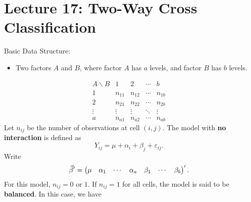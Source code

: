 \section{Lecture 17: Two-Way Cross Classification}
Basic Data Structure:
\begin{itemize}
    \item Two factors $ A $ and $ B $, where
          factor $ A $ has $ a $ levels, and factor $ B $
          has $ b $ levels.
\end{itemize}
\[ \begin{array}{ccccc}
        A\backslash B & 1      & 2      & \cdots & b      \\
        1             & n_{11} & n_{12} & \cdots & n_{1b} \\
        2             & n_{21} & n_{22} & \cdots & n_{2b} \\
        \vdots        & \vdots & \vdots & \ddots & \vdots \\
        a             & n_{a1} & n_{a2} & \cdots & n_{ab}
    \end{array} \]
Let $ n_{ij} $ be the number of observations at cell $ (i,j) $. The model with
\textbf{no interaction} is defined as
\[ Y_{ij}=\mu+\alpha_i+\beta_j+\varepsilon_{ij}. \]
Write
\[ \vec{\beta}'=\begin{pmatrix}
        \mu & \alpha_1 & \cdots & \alpha_a & \beta_1 & \cdots & \beta_b
    \end{pmatrix}'. \]
For this model, $ n_{ij}=0 $ or $ 1 $. If $ n_{ij}=1 $ for all cells, the model
is said to be \textbf{balanced}. In this case, we have
